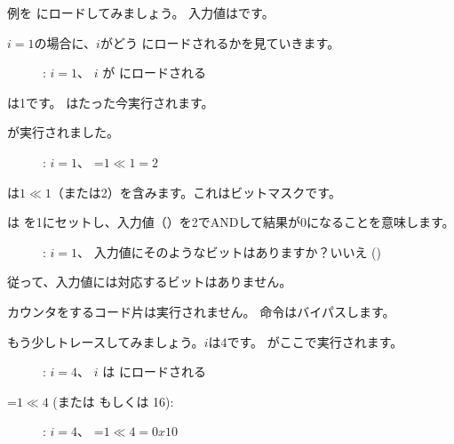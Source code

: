 ﻿\clearpage
\mysubparagraph{\olly}
\myindex{\olly}

例を \olly にロードしてみましょう。
入力値はです。

$i=1$の場合に、$i$がどう \ECX にロードされるかを見ていきます。

\begin{figure}[H]
\centering
{}
\caption{\olly: $i=1$、 $i$ が \ECX にロードされる}
\label{fig:shifts_olly1_1}
\end{figure}

\EDX は1です。 \SHL はたった今実行されます。

\clearpage
\SHL が実行されました。

\begin{figure}[H]
\centering
{}
\caption{\olly: $i=1$、 \EDX=$1 \ll 1=2$}
\label{fig:shifts_olly1_2}
\end{figure}

\EDX は$1 \ll 1$（または2）を含みます。これはビットマスクです。

\clearpage
\AND は \ZF を1にセットし、入力値（）を2でANDして結果が0になることを意味します。

\begin{figure}[H]
\centering
{}
\caption{\olly: $i=1$、
入力値にそのようなビットはありますか？いいえ ()}
\label{fig:shifts_olly1_3}
\end{figure}

従って、入力値には対応するビットはありません。

カウンタをするコード片は実行されません。
\JZ 命令はバイパスします。

\clearpage
もう少しトレースしてみましょう。$i$は4です。
\SHL がここで実行されます。

\begin{figure}[H]
\centering
{}
\caption{\olly: $i=4$、 $i$ は \ECX にロードされる}
\label{fig:shifts_olly4_1}
\end{figure}

\clearpage
\EDX=$1 \ll 4$ (または  もしくは 16): 

\begin{figure}[H]
\centering
{}
\caption{\olly: $i=4$、 \EDX=$1 \ll 4=0x10$}
\label{fig:shifts_olly4_2}
\end{figure}

